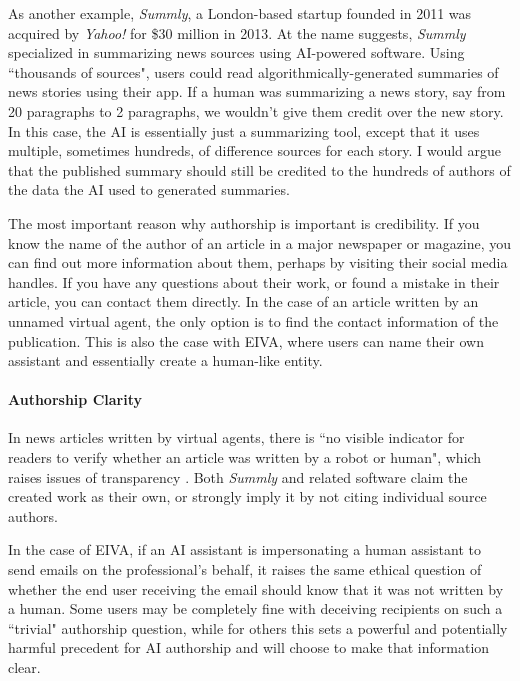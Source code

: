 \documentclass{article}
\begin{document}
As another example, \emph{Summly}, a London-based startup founded in 2011 was acquired by \emph{Yahoo!} for \$30 million in 2013. At the name suggests, \emph{Summly} specialized in summarizing news sources using AI-powered software. Using ``thousands of sources", users could read algorithmically-generated summaries of news stories using their app. If a human was summarizing a news story, say from 20 paragraphs to 2 paragraphs, we wouldn't give them credit over the new story. In this case, the AI is essentially just a summarizing tool, except that it uses multiple, sometimes hundreds, of difference sources for each story. I would argue that the published summary should still be credited to the hundreds of authors of the data the AI used to generated summaries.

The most important reason why authorship is important is credibility. If you know the name of the author of an article in a major newspaper or magazine, you can find out more information about them, perhaps by visiting their social media handles. If you have any questions about their work, or found a mistake in their article, you can contact them directly. In the case of an article written by an unnamed virtual agent, the only option is to find the contact information of the publication. This is also the case with EIVA, where users can name their own assistant and essentially create a human-like entity.

\paragraph{Authorship Clarity}

In news articles written by virtual agents, there is ``no visible indicator for readers to verify whether an article was written by a robot or human", which raises issues of transparency \cite{dorr_ethical_2017}. Both \emph{Summly} and related software claim the created work as their own, or strongly imply it by not citing individual source authors.

In the case of EIVA, if an AI assistant is impersonating a human assistant to send emails on the professional's behalf, it raises the same ethical question of whether the end user receiving the email should know that it was not written by a human. Some users may be completely fine with deceiving recipients on such a ``trivial" authorship question, while for others this sets a powerful and potentially harmful precedent for AI authorship and will choose to make that information clear.
\end{document}
